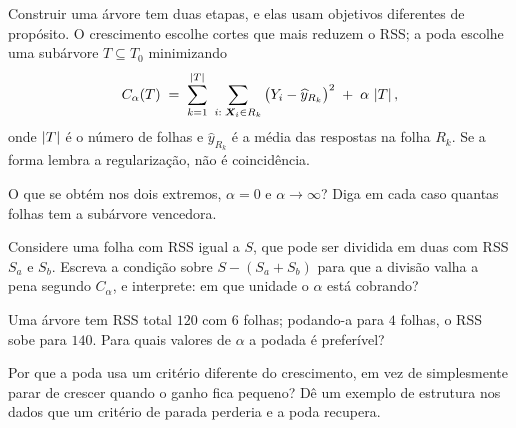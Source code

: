 Construir uma árvore tem duas etapas, e elas usam objetivos diferentes de
propósito. O crescimento escolhe cortes que mais reduzem o RSS; a poda escolhe uma
subárvore $T\subseteq T_0$ minimizando
\[
  C_\alpha(T) \;=\; \sum_{k=1}^{\left\lvert T \right\rvert}\ \sum_{i:\;\bm{X}_i\in R_k}
    \big(Y_i-\widehat y_{R_k}\big)^2 \;+\; \alpha\,\left\lvert T \right\rvert,
\]
onde $\left\lvert T \right\rvert$ é o número de folhas e $\widehat y_{R_k}$ é a média das respostas na
folha $R_k$.
Se a forma lembra a regularização, não é coincidência.
\begin{itens}
  \item {} O que se obtém nos dois extremos, $\alpha=0$ e
        $\alpha\to\infty$? Diga em cada caso quantas folhas tem a subárvore
        vencedora.
  \item {} Considere uma folha com RSS igual a $S$, que pode ser dividida
        em duas com RSS $S_a$ e $S_b$. Escreva a condição sobre
        $S-(S_a+S_b)$ para que a divisão valha a pena segundo $C_\alpha$, e
        interprete: em que unidade o $\alpha$ está cobrando?
  \item {} Uma árvore tem RSS total $120$ com $6$ folhas; podando-a para
        $4$ folhas, o RSS sobe para $140$. Para quais valores de $\alpha$ a podada
        é preferível?
  \item {} Por que a poda usa um critério diferente do crescimento, em vez
        de simplesmente parar de crescer quando o ganho fica pequeno? Dê um
        exemplo de estrutura nos dados que um critério de parada perderia e a poda
        recupera.
\end{itens}

